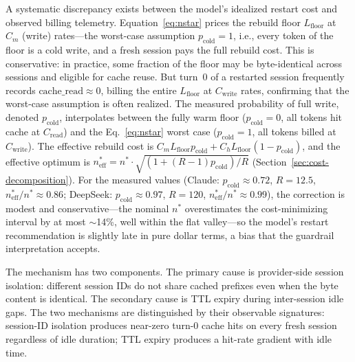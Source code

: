 \documentclass[11pt]{article}
\theoremstyle{definition}
\theoremstyle{remark}
\begin{document}
A systematic discrepancy exists between the model's idealized restart cost and observed billing telemetry. Equation~\eqref{eq:nstar} prices the rebuild floor $L_{\text{floor}}$ at $C_m$ (write) rates---the worst-case assumption $p_{\text{cold}}=1$, i.e., every token of the floor is a cold write, and a fresh session pays the full rebuild cost. This is conservative: in practice, some fraction of the floor may be byte-identical across sessions and eligible for cache reuse. But turn~0 of a restarted session frequently records $\text{cache\_read} \approx 0$, billing the entire $L_{\text{floor}}$ at $C_{\text{write}}$ rates, confirming that the worst-case assumption is often realized. The measured probability of full write, denoted $p_{\text{cold}}$, interpolates between the fully warm floor ($p_{\text{cold}}=0$, all tokens hit cache at $C_{\text{read}}$) and the Eq.~\eqref{eq:nstar} worst case ($p_{\text{cold}}=1$, all tokens billed at $C_{\text{write}}$). The effective rebuild cost is $C_m L_{\text{floor}} p_{\text{cold}} + C_h L_{\text{floor}} (1-p_{\text{cold}})$, and the effective optimum is $n^*_{\text{eff}} = n^* \cdot \sqrt{(1+(R-1)p_{\text{cold}})/R}$ (Section~\ref{sec:cost-decomposition}). For the measured values (Claude: $p_{\text{cold}} \approx 0.72$, $R=12.5$, $n^*_{\text{eff}}/n^* \approx 0.86$; DeepSeek: $p_{\text{cold}} \approx 0.97$, $R=120$, $n^*_{\text{eff}}/n^* \approx 0.99$), the correction is modest and conservative---the nominal $n^*$ overestimates the cost-minimizing interval by at most $\sim$14\%, well within the flat valley---so the model's restart recommendation is slightly late in pure dollar terms, a bias that the guardrail interpretation accepts.

The mechanism has two components. The primary cause is provider-side session isolation: different session IDs do not share cached prefixes even when the byte content is identical. The secondary cause is TTL expiry during inter-session idle gaps. The two mechanisms are distinguished by their observable signatures: session-ID isolation produces near-zero turn-0 cache hits on every fresh session regardless of idle duration; TTL expiry produces a hit-rate gradient with idle time.
\end{document}
